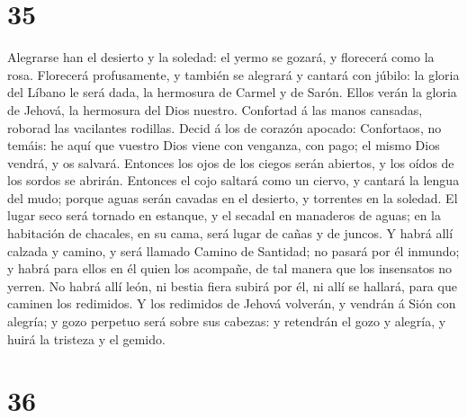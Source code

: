 \hypertarget{section-34}{%
\section{35}\label{section-34}}

 Alegrarse han el desierto y la soledad: el yermo se
gozará, y florecerá como la rosa.  Florecerá profusamente,
y también se alegrará y cantará con júbilo: la gloria del Líbano le será
dada, la hermosura de Carmel y de Sarón. Ellos verán la gloria de
Jehová, la hermosura del Dios nuestro.  Confortad á las
manos cansadas, roborad las vacilantes rodillas.  Decid á
los de corazón apocado: Confortaos, no temáis: he aquí que vuestro Dios
viene con venganza, con pago; el mismo Dios vendrá, y os salvará.
 Entonces los ojos de los ciegos serán abiertos, y los
oídos de los sordos se abrirán.  Entonces el cojo saltará
como un ciervo, y cantará la lengua del mudo; porque aguas serán cavadas
en el desierto, y torrentes en la soledad.  El lugar seco
será tornado en estanque, y el secadal en manaderos de aguas; en la
habitación de chacales, en su cama, será lugar de cañas y de juncos.
 Y habrá allí calzada y camino, y será llamado Camino de
Santidad; no pasará por él inmundo; y habrá para ellos en él quien los
acompañe, de tal manera que los insensatos no yerren.  No
habrá allí león, ni bestia fiera subirá por él, ni allí se hallará, para
que caminen los redimidos.  Y los redimidos de Jehová
volverán, y vendrán á Sión con alegría; y gozo perpetuo será sobre sus
cabezas: y retendrán el gozo y alegría, y huirá la tristeza y el gemido.

\hypertarget{section-35}{%
\section{36}\label{section-35}}

